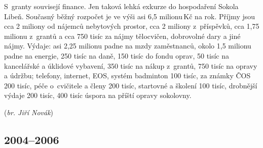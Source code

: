 \documentclass[a5paper, 11pt, twoside]{article}
\begin{document}
S~granty souvisejí finance. Jen taková lehká exkurze do hospodaření
Sokola Libeň. Současný běžný rozpočet je ve výši asi 6,5 milionu\,Kč na
rok. Příjmy jsou cca 2 miliony od nájemců nebytových prostor, cca 2
miliony z~příspěvků, cca 1,75 milionu z~grantů a cca 750 tisíc za nájmy
tělocvičen, dobrovolné dary a jiné nájmy. Výdaje: asi 2,25 milionu padne
na mzdy zaměstnanců, okolo 1,5 milionu padne na energie, 250 tisíc na
daně, 150 tisíc do fondu oprav, 50 tisíc na kancelářské a úklidové
vybavení, 350 tisíc na nákup z~grantů, 750 tisíc na opravy a údržbu;
telefony, internet, EOS, systém badminton 100 tisíc, za známky ČOS 200
tisíc, péče o~cvičitele a členy 200 tisíc, startovné a školení 100
tisíc, drobnější výdaje 200 tisíc, 400 tisíc úspora na příští opravy
sokolovny.

\hfill(\textit{br. Jiří Novák})

\subsection{2004--2006}
\end{document}
